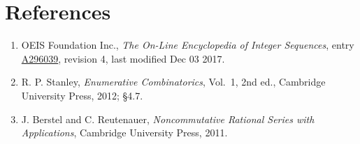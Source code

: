 \documentclass[11pt]{article}
\theoremstyle{definition}
\begin{document}
\section{References}

\begin{enumerate}

\item OEIS Foundation Inc., \emph{The On-Line Encyclopedia of Integer Sequences}, entry \href{https://oeis.org/A296039}{A296039}, revision 4, last modified Dec 03 2017.

\item R. P. Stanley, \emph{Enumerative Combinatorics}, Vol.~1, 2nd ed., Cambridge University Press, 2012; \S4.7.

\item J. Berstel and C. Reutenauer, \emph{Noncommutative Rational Series with Applications}, Cambridge University Press, 2011.

\end{enumerate}
\end{document}
